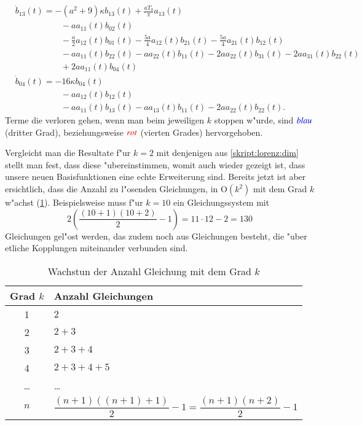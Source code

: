 \begin{align*}
\\
&
\dot{b}_{13}(t)
=
-
(a^2+9)
\kappa
b_{13}(t)
+
\frac{a T_{0}}{\pi} a_{13}(t)
\\
&\phantom{aaaaaaaaaa}
-
a
a_{11}(t) b_{02}(t)
\\
&\phantom{aaaaaaaaaa}
-
\frac{a}{2} a_{12}(t) b_{01}(t)
-
\frac{5 a}{4} a_{12}(t) b_{21}(t)
-
\frac{5 a}{4} a_{21}(t) b_{12}(t)
\\
&\phantom{aaaaaaaaaa}
-
a
a_{11}(t) b_{22}(t)
-
a
a_{22}(t) b_{11}(t)
-
2 a
a_{22}(t) b_{31}(t)
-
2 a
a_{31}(t) b_{22}(t)
\\
&\phantom{aaaaaaaaaa}
+
2 a
a_{11}(t) b_{04}(t)
\\
&
\dot{b}_{04}(t)
=
-
16
\kappa
b_{04}(t)
\\
&\phantom{aaaaaaaaaa}
-
a
a_{12}(t) b_{12}(t)
\\
&\phantom{aaaaaaaaaa}
-
a
a_{11}(t) b_{13}(t)
-
a
a_{13}(t) b_{11}(t)
-
2a
a_{22}(t) b_{22}(t).
\end{align*}
Terme die verloren gehen, wenn man beim jeweiligen $k$ stoppen w"urde, sind 
$\color{blue}{blau}$ (dritter Grad), beziehungsweise $\color{red}{rot}$ 
(vierten Grades) hervorgehoben.

Vergleicht man die Resultate f"ur $k = 2$ mit denjenigen aus 
\cref{skript:lorenz:dim} stellt man fest, dass diese "ubereinstimmen, womit 
auch wieder gezeigt ist, dass unsere neuen Basisfunktionen eine echte 
Erweiterung sind. Bereits jetzt ist aber ersichtlich, dass die Anzahl 
zu l"osenden Gleichungen, in $\text{O}(k^2)$ mit dem Grad $k$ w"achst 
(\cref{table:lorenz2:degree}). Beispielsweise muss f"ur $k = 10$ ein 
Gleichungssystem mit
\begin{equation*}
	2\left(\frac{(10 + 1)(10 + 2)}{2} - 1\right) = 11 \cdot 12 - 2 = 130
\end{equation*}
Gleichungen gel"ost werden, das zudem noch aus Gleichungen besteht, die "uber 
etliche Kopplungen miteinander verbunden sind.

\begin{table}
	\centering
	\begin{tabular}{c | l}
		Grad $k$ & Anzahl Gleichungen \\
		\hline
		1 & $2$ \\
		2 & $2 + 3$ \\
		3 & $2 + 3 + 4$\\
		4 & $2 + 3 + 4 + 5$\\
		\dots & \dots \\
		$n$ & $\dfrac{(n + 1)((n + 1) + 1)}{2} - 1
		= \dfrac{(n + 1)(n + 2)}{2} - 1$
	\end{tabular}
	\caption{Wachstun der Anzahl Gleichung mit dem Grad $k$}
	\label{table:lorenz2:degree}
\end{table}
